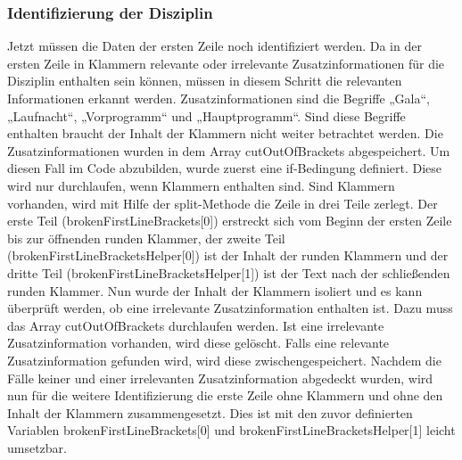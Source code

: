 {\subsubsection{Identifizierung der Disziplin}
Jetzt müssen die Daten der ersten Zeile noch identifiziert werden. 
Da in der ersten Zeile in Klammern relevante oder irrelevante Zusatzinformationen für die Disziplin enthalten sein können, müssen in diesem Schritt die relevanten Informationen erkannt werden. Zusatzinformationen sind die Begriffe „Gala“, „Laufnacht“, „Vorprogramm“ und „Hauptprogramm“. Sind diese Begriffe enthalten braucht der Inhalt der Klammern nicht weiter betrachtet werden. Die Zusatzinformationen wurden in dem Array cutOutOfBrackets abgespeichert. Um diesen Fall im Code abzubilden, wurde zuerst eine if-Bedingung definiert. Diese wird nur durchlaufen, wenn Klammern enthalten sind. Sind Klammern vorhanden, wird mit Hilfe der split-Methode die Zeile in drei Teile zerlegt. Der erste Teil (brokenFirstLineBrackets[0]) erstreckt sich vom Beginn der ersten Zeile bis zur öffnenden runden Klammer, der zweite Teil (brokenFirstLineBracketsHelper[0]) ist der Inhalt der runden Klammern und der dritte Teil (brokenFirstLineBracketsHelper[1]) ist der Text nach der schließenden runden Klammer. Nun wurde der Inhalt der Klammern isoliert und es kann überprüft werden, ob eine irrelevante Zusatzinformation enthalten ist. Dazu muss das Array cutOutOfBrackets durchlaufen werden. Ist eine irrelevante Zusatzinformation vorhanden, wird diese gelöscht. Falls eine relevante Zusatzinformation gefunden wird, wird diese zwischengespeichert. Nachdem die Fälle keiner und einer irrelevanten Zusatzinformation abgedeckt wurden, wird nun für die weitere Identifizierung die erste Zeile ohne Klammern und ohne den Inhalt der Klammern zusammengesetzt. Dies ist mit den zuvor definierten Variablen brokenFirstLineBrackets[0] und brokenFirstLineBracketsHelper[1] leicht umsetzbar.\\

}
